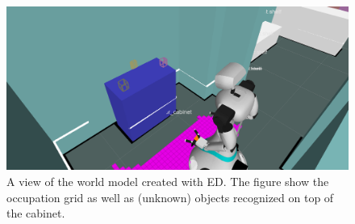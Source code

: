 \begin{figure}[h]
\centering
	\includegraphics[width = 0.8\linewidth]{Figures/ed_segmentation}
	\caption{A view of the world model created with ED. The figure show the occupation grid as well as (unknown) objects recognized on top of the cabinet.}
	\label{fig:ed_segmentation}
\end{figure}

